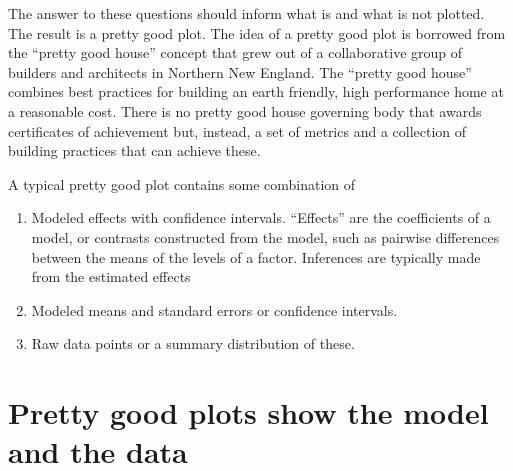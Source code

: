 \documentclass[]{book}
\providecommand{\tightlist}{%
  \setlength{\itemsep}{0pt}\setlength{\parskip}{0pt}}
\begin{document}
The answer to these questions should inform what is and what is not plotted. The result is a pretty good plot. The idea of a pretty good plot is borrowed from the ``pretty good house'' concept that grew out of a collaborative group of builders and architects in Northern New England. The ``pretty good house'' combines best practices for building an earth friendly, high performance home at a reasonable cost. There is no pretty good house governing body that awards certificates of achievement but, instead, a set of metrics and a collection of building practices that can achieve these.

A typical pretty good plot contains some combination of

\begin{enumerate}
\def\labelenumi{\arabic{enumi}.}
\tightlist
\item
  Modeled effects with confidence intervals. ``Effects'' are the coefficients of a model, or contrasts constructed from the model, such as pairwise differences between the means of the levels of a factor. Inferences are typically made from the estimated effects
\item
  Modeled means and standard errors or confidence intervals.
\item
  Raw data points or a summary distribution of these.
\end{enumerate}

\hypertarget{pretty-good-plots-show-the-model-and-the-data}{%
\section{Pretty good plots show the model and the data}\label{pretty-good-plots-show-the-model-and-the-data}}
\end{document}
